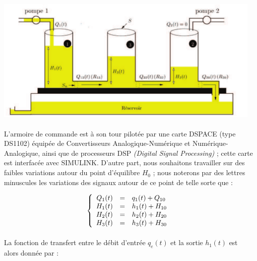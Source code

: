 \documentclass[12pt, a4paper, openany]{report}
\begin{document}
 \begin{center}
   \includegraphics[width=13cm]{rebout.png}
   \label{fig1}
 \end{center}   
  
 \paragraph{}
L’armoire de commande est à son tour pilotée par une carte DSPACE (type DS1102)
équipée de Convertisseurs Analogique-Numérique et Numérique-Analogique, ainsi que de
processeurs DSP \textit{(Digital Signal Processing)} ; cette carte est interfacée avec SIMULINK.
D’autre part, nous souhaitons travailler sur des faibles variations autour du point
d’équilibre \hspace{1mm}$H_{0}$\hspace{1mm} ; nous noterons par des lettres minuscules les variations des signaux autour
de ce point de telle sorte que :

\[\left \{
   \begin{array}{r c l}
      Q_{1}(t)  & = & q_{1}(t)+Q_{10} \\
      H_{1}(t)  & = & h_{1}(t)+H_{10} \\
      H_{2}(t)  & = & h_{2}(t)+H_{20} \\
      H_{3}(t)  & = & h_{3}(t)+H_{30} \\
   \end{array}
   \right .\]
 
 \paragraph{}
 La fonction de transfert entre le débit d’entrée \hspace{1mm}$q_{e}(t)$\hspace{1mm} et la sortie \hspace{1mm}$h_{1}(t)$ \hspace{1mm}est alors donnée par :\\[0.75mm]
 
\end{document}
